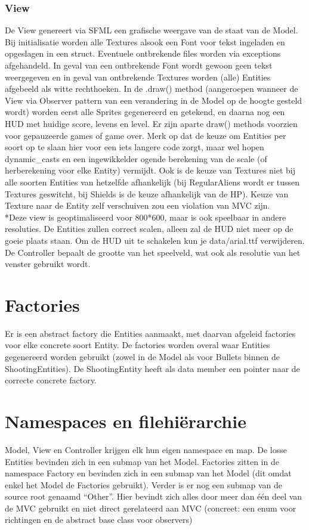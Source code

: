 \documentclass[11pt, a4paper]{article}
\begin{document}
\subsubsection{View}
De View genereert via SFML een grafische weergave van de staat van de Model. Bij initialisatie worden alle Textures alsook een Font voor tekst ingeladen en opgeslagen in een struct. Eventuele ontbrekende files worden via exceptions afgehandeld. In geval van een ontbrekende Font wordt gewoon geen tekst weergegeven en in geval van ontbrekende Textures worden (alle) Entities afgebeeld als witte rechthoeken. In de .draw() method (aangeroepen wanneer de View via Observer pattern van een verandering in de Model op de hoogte gesteld wordt) worden eerst alle Sprites gegenereerd en getekend, en daarna nog een HUD met huidige score, levens en level. Er zijn aparte draw() methods voorzien voor gepauzeerde games of game over. Merk op dat de keuze om Entities per soort op te slaan hier voor een iets langere code zorgt, maar wel hopen dynamic\_casts en een ingewikkelder ogende berekening van de scale (of herberekening voor elke Entity) vermijdt. Ook is de keuze van Textures niet bij alle soorten Entities van hetzelfde afhankelijk (bij RegularAliens wordt er tussen Textures geswitcht, bij Shields is de keuze afhankelijk van de HP). Keuze van Texture naar de Entity zelf verschuiven zou een violation van MVC zijn.
\\*Deze view is geoptimaliseerd voor 800*600, maar is ook speelbaar in andere resoluties. De Entities zullen correct scalen, alleen zal de HUD niet meer op de goeie plaats staan. Om de HUD uit te schakelen kun je data/arial.ttf verwijderen. De Controller bepaalt de grootte van het speelveld, wat ook als resolutie van het venster gebruikt wordt.

\section{Factories}
Er is een abstract factory die Entities aanmaakt, met daarvan afgeleid factories voor elke concrete soort Entity. De factories worden overal waar Entities gegenereerd worden gebruikt (zowel in de Model als voor Bullets binnen de ShootingEntities). De ShootingEntity heeft als data member een pointer naar de correcte concrete factory.

\section{Namespaces en filehi\"erarchie}
 Model, View en Controller krijgen elk hun eigen namespace en map. De losse Entities bevinden zich in een submap van het Model. Factories zitten in de namespace Factory en bevinden zich in een submap van het Model (dit omdat enkel het Model de Factories gebruikt). Verder is er nog een submap van de source root genaamd “Other”. Hier bevindt zich alles door meer dan \'e\'en deel van de MVC gebruikt en niet direct gerelateerd aan MVC (concreet: een enum voor richtingen en de abstract base class voor observers)
\end{document}
